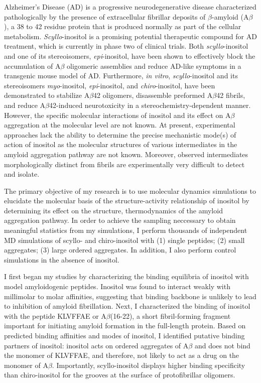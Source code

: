 
Alzheimer's Disease (AD) is a progressive neurodegenerative disease characterized pathologically by the presence of extracellular fibrillar deposits of $\beta$-amyloid (A$\beta$), a 38 to 42 residue protein that is produced normally as part of the cellular metabolism. \emph{Scyllo}-inositol is a promising potential therapeutic compound for AD treatment, which is currently in phase two of clinical trials. Both \emph{scyllo}-inositol and one of its stereoisomers, \emph{epi}-inositol, have been shown to effectively block the accumulation of A$\beta$ oligomeric assemblies and reduce AD-like symptoms in a transgenic mouse model of AD. Furthermore, \emph{in vitro}, \emph{scyllo}-inositol and its stereoisomers \emph{myo}-inositol, \emph{epi}-inositol, and \emph{chiro}-inositol, have been demonstrated to stabilize A$\beta$42 oligomers, disassemble preformed A$\beta$42 fibrils, and reduce A$\beta$42-induced neurotoxicity in a stereochemistry-dependent manner. However, the specific molecular interactions of inositol and its effect on A$\beta$ aggregation at the molecular level are not known. At present, experimental approaches lack the ability to determine the precise mechanistic mode(s) of action of inositol as the molecular structures of various intermediates in the amyloid aggregation pathway are not known. Moreover, observed intermediates morphologically distinct from fibrils are experimentally very difficult to detect and isolate.

The primary objective of my research is to use molecular dynamics simulations to elucidate the molecular basis of the structure-activity relationship of inositol by determining its effect on the structure, thermodynamics of the amyloid aggregation pathway.  In order to achieve the sampling neccessary to obtain meaningful statistics from my simulations, I perform thousands of independent MD simulations of scyllo- and chiro-inositol with (1) single peptides; (2) small aggregates; (3) large ordered aggregates. In addition, I also perform control simulations in the absence of inositol. 

I first began my studies by characterizing the binding equilibria of inositol with model amyloidogenic peptides.  Inositol was found to interact weakly with millimolar to molar affinities, suggesting that binding backbone is unlikely to lead to inhibition of amyloid fibrillation. Next, I characterized the binding of inositol with the peptide KLVFFAE or A$\beta$(16-22), a short fibril-forming fragment important for initiating amyloid formation in the full-length protein.  Based on predicted binding affinities and modes of inositol, I identified putative binding partners of inositol:  inositol acts on ordered aggregates of A$\beta$ and does not bind the monomer of KLVFFAE, and therefore, not likely to act as a drug on the monomer of A$\beta$. Importantly, scyllo-inositol displays higher binding specificity than chiro-inositol for the grooves at the surface of protofibrillar oligomers. 

